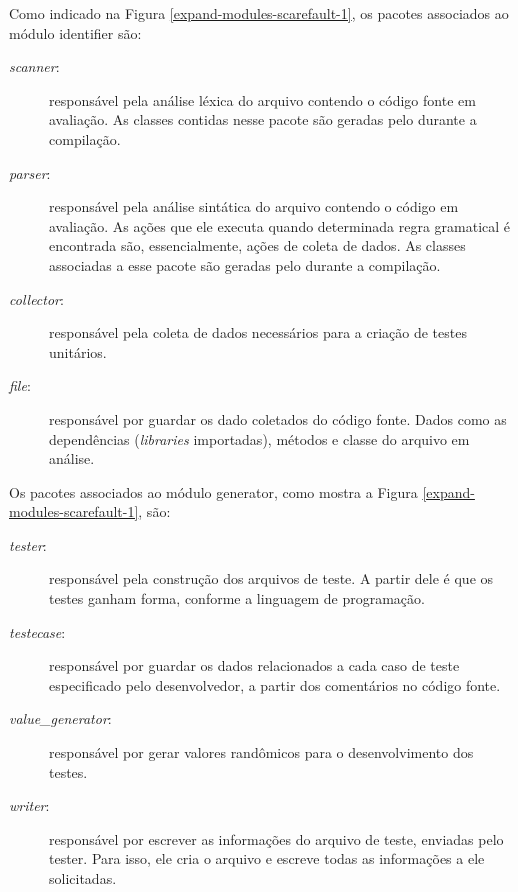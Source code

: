 Como indicado na Figura \ref{expand-modules-scarefault-1}, os pacotes associados ao
módulo \textsf{identifier} são:
\begin{description}
\item[\textit{scanner}:] responsável pela análise léxica do arquivo contendo o código
fonte em avaliação. As classes contidas nesse pacote são geradas pelo \flexcpp durante
a compilação.
\item[\textit{parser}:] responsável pela análise sintática do arquivo contendo o
código em avaliação. As ações que ele executa quando determinada regra gramatical é
encontrada são, essencialmente, ações de coleta de dados. As classes associadas
a esse pacote são geradas pelo \bisoncpp durante a compilação.
\item[\textit{collector}:] responsável pela coleta de dados necessários para a
criação de testes unitários.
\item[\textit{file}:] responsável por guardar os dado coletados do código fonte.
Dados como as dependências (\textit{libraries} importadas), métodos e classe
do arquivo em análise.
\end{description}

Os pacotes associados ao módulo \textsf{generator}, como mostra a Figura
\ref{expand-modules-scarefault-1}, são:
\begin{description}
\item[	\textit{tester}:] responsável pela construção dos arquivos de teste. A partir
dele é que os testes ganham forma, conforme a linguagem de programação.
\item[	\textit{testecase}:] responsável por guardar os dados relacionados
a cada caso de teste especificado pelo desenvolvedor, a partir dos
comentários no código fonte.
\item[	\textit{value\_generator}:] responsável por gerar valores randômicos
para o desenvolvimento dos testes.
\item[\textit{writer}:] responsável por escrever as informações do arquivo de
teste, enviadas pelo \textsf{tester}. Para isso, ele cria o arquivo e
escreve todas as informações a ele solicitadas.
\end{description}

